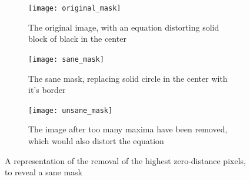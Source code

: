 \documentclass[../main.tex]{subfiles}
\begin{document}
    \begin{figure}[H]
      \centering
      \begin{subfigure}[B]{0.9\textwidth}
        \centering
        \texttt{[image: original\_mask]}
        \caption{The original image, with an equation distorting solid block of black in the center}
      \end{subfigure}

      \begin{subfigure}[B]{0.9\textwidth}
        \centering
        \texttt{[image: sane\_mask]}
        \caption{The sane mask, replacing solid circle in the center with it's border}
      \end{subfigure}

      \begin{subfigure}[B]{0.9\textwidth}
        \centering
        \texttt{[image: unsane\_mask]}
        \caption{The image after too many maxima have been removed, which would also distort the equation}
      \end{subfigure}
      \caption{A representation of the removal of the highest zero-distance pixels, to reveal a sane mask}
      \label{sanemasking}
    \end{figure}
\end{document}
